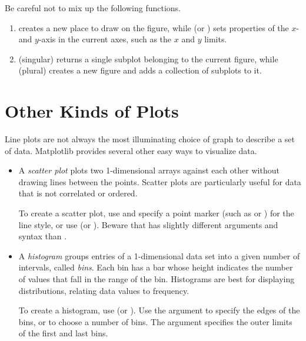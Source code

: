 \begin{warn}
Be careful not to mix up the following functions.
\begin{enumerate}
    \item {} creates a new place to draw on the figure, while  (or ) sets properties of the $x$- and $y$-axis in the current axes, such as the $x$ and $y$ limits.
    \item {} (singular) returns a single subplot belonging to the current figure, while  (plural) creates a new figure and adds a collection of subplots to it.
\end{enumerate}
\end{warn}

\section*{Other Kinds of Plots} %

Line plots are not always the most illuminating choice of graph to describe a set of data.
Matplotlib provides several other easy ways to visualize data.

\begin{itemize}
\item A \emph{scatter plot} plots two 1-dimensional arrays against each other without drawing lines between the points.
Scatter plots are particularly useful for data that is not correlated or ordered.

To create a scatter plot, use  and specify a point marker (such as  or ) for the line style, or use  (or ).
Beware that  has slightly different arguments and syntax than .

\item A \emph{histogram} groups entries of a 1-dimensional data set into a given number of intervals, called \emph{bins}.
Each bin has a bar whose height indicates the number of values that fall in the range of the bin.
Histograms are best for displaying distributions, relating data values to frequency.

To create a histogram, use  (or ).
Use the argument  to specify the edges of the bins, or to choose a number of bins.
The  argument specifies the outer limits of the first and last bins.
\end{itemize}


